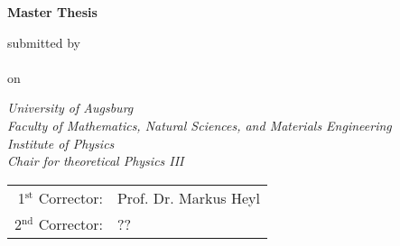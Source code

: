 

\newcommand{\mail}{jonas.kell@student.uni-augsburg.de}



\begin{titlepage}
    
\color{dblue}

\begin{center}
    \vspace*{2cm}
    \Huge
    \textbf{\thetitle}

    \vspace*{1.5cm}
    \color{black}
    \textbf{Master Thesis}

    \vspace*{1cm}
    \normalsize
    submitted by\\
    \LARGE
    \theauthor\\\vspace*{0.3cm}
    \normalsize
    on \thedate

    \vspace{1.8cm}
    \color{black}
    \emph{University of Augsburg}\\
    \emph{Faculty of Mathematics, Natural Sciences, and Materials Engineering}\\
    \emph{Institute of Physics}\\
    \emph{Chair for theoretical Physics III}

    \vfill

    \begin{tabular}{rl}
        1$^\text{st}$ Corrector: &Prof. Dr. Markus Heyl\\
        2$^\text{nd}$ Corrector: &??\\ %
    \end{tabular}
\end{center}

\end{titlepage}
